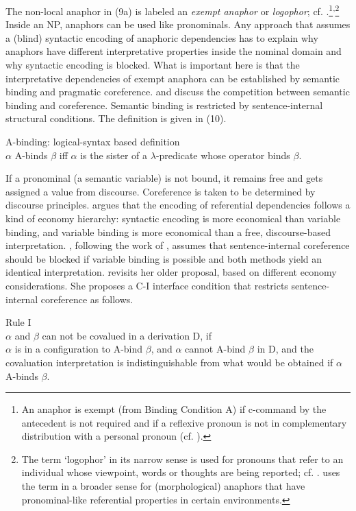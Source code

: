 \documentclass[output=paper]{langsci/langscibook}
\begin{document}
The non-local anaphor in (9a) is labeled an \textit{exempt anaphor} or \textit{logophor}; cf. \citet{Reuland2011}.\footnote{An anaphor is exempt (from Binding Condition A) if c-command by the antecedent is not required and if a reflexive pronoun is not in complementary distribution with a personal pronoun (cf. \citealt{Büring2005}).}\textsuperscript{,}\footnote{The term ‘logophor’ in its narrow sense is used for pronouns that refer to an individual whose viewpoint, words or thoughts are being reported; cf. \citet{Speas2004}. \citet{Reuland2011} uses the term in a broader sense for (morphological) anaphors that have pronominal-like referential properties in certain environments.}  Inside an NP, anaphors can be used like pronominals. Any approach that assumes a (blind) syntactic encoding of anaphoric dependencies has to explain why anaphors have different interpretative properties inside the nominal domain and why syntactic encoding is blocked. What is important here is that the interpretative dependencies of exempt anaphora can be established by semantic binding and pragmatic coreference. \citet{Reinhart2006} and \citet{Reuland2011} discuss the competition between semantic binding and coreference. Semantic binding is restricted by sentence-internal structural conditions. The definition is given in (10). 

\ea%
    \label{ex:wein:10}
    A-binding: logical-syntax based definition \citep[171]{Reinhart2006}\\
    $\alpha $ A-binds $\beta $ iff $\alpha $ is the sister of a $\lambda $-predicate whose operator binds $\beta $.
\z

If a pronominal (a semantic variable) is not bound, it remains free and gets assigned a value from discourse. Coreference is taken to be determined by discourse principles. \citet{Reuland2011} argues that the encoding of referential dependencies follows a kind of economy hierarchy: syntactic encoding is more economical than variable binding, and variable binding is more economical than a free, discourse-based interpretation. \citet{Reuland2011}, following the work of \citet{Reinhart1983}, assumes that sentence-internal coreference should be blocked if variable binding is possible and both methods yield an identical interpretation. \citet{Reinhart2006} revisits her older proposal, based on different economy considerations. She proposes a C-I interface condition that restricts sentence-internal coreference as follows.

\ea%
    Rule I \citep[185]{Reinhart2006}\\
$\alpha $ and $\beta $ can not be covalued in a derivation D, if\\\label{ex:wein:11}
    \ea $\alpha $ is in a configuration to A-bind $\beta $, and
    \ex $\alpha $ cannot A-bind $\beta $ in D, and
    \ex the covaluation interpretation is indistinguishable from what would be obtained if $\alpha $ A-binds $\beta $.
    \z
\z
\end{document}
